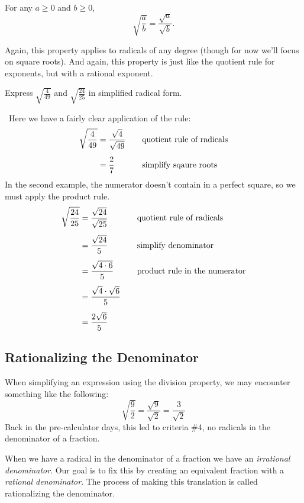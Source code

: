 \begin{boxeddef}
For any $a \geq 0$ and $b \geq 0$, \[\sqrt{\frac{a}{b}} = \dfrac{\sqrt{a}}{\sqrt{b}}.\]
\end{boxeddef}

Again, this property applies to radicals of any degree (though for now we'll focus on square roots). And again, this property is just like the quotient rule for exponents, but with a rational exponent.

\begin{boxedex}
Express $\sqrt{\frac{4}{49}}$ and $\sqrt{\frac{24}{25}}$ in simplified radical form.

\exsoln\ Here we have a fairly clear application of the rule:
\[\begin{aligned}
\sqrt{\frac{4}{49}}	&= \frac{\sqrt{4}}{\sqrt{49}}
&& \text{\quad quotient rule of radicals}\\[1ex]
&= \frac{2}{7}
&& \text{\quad simplify sqaure roots}\\
\end{aligned}
\]
In the second example, the numerator doesn't contain in a perfect square, so we must apply the product rule.
\[\begin{aligned}
\sqrt{\frac{24}{25}}	&= \frac{\sqrt{24}}{\sqrt{25}}
&& \text{\quad quotient rule of radicals}\\[1ex]
&= \frac{\sqrt{24}}{5}
&& \text{\quad simplify denominator}\\[1ex]
&= \frac{\sqrt{4\cdot6}}{5}
&& \text{\quad product rule in the numerator}\\[1ex]
&= \frac{\sqrt{4}\cdot\sqrt{6}}{5}\\[1ex]
&= \frac{2\sqrt{6}}{5}
\end{aligned}
\]
\end{boxedex}

\subsection{Rationalizing the Denominator}

When simplifying an expression using the division property, we may encounter something like the following: \[\sqrt{\frac{9}{2}} = \frac{\sqrt{9}}{\sqrt{2}} = \frac{3}{\sqrt{2}}\]
Back in the pre-calculator days, this led to criteria \#4, no radicals in the denominator of a fraction.

When we have a radical in the denominator of a fraction we have an \textit{irrational denominator}. Our goal is to fix this by creating an equivalent fraction with a \textit{rational denominator}. The process of making this translation is called \gls{rationalizing the denominator}.

